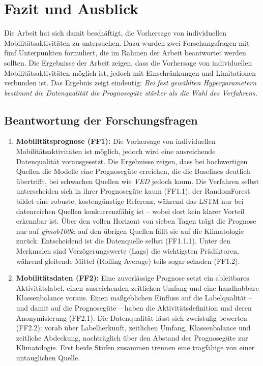 \chapter{Fazit und Ausblick}
\label{ch:fazit}

Die Arbeit hat sich damit beschäftigt, die Vorhersage von individuellen Mobilitätsaktivitäten zu untersuchen. Dazu wurden zwei Forschungsfragen mit fünf Unterpunkten formuliert, die im Rahmen der Arbeit beantwortet werden sollten. Die Ergebnisse der Arbeit zeigen, dass die Vorhersage von individuellen Mobilitätsaktivitäten möglich ist, jedoch mit Einschränkungen und Limitationen verbunden ist. Das Ergebnis zeigt eindeutig: \emph{Bei fest gewählten Hyperparametern bestimmt die Datenqualität die Prognosegüte stärker als die Wahl des
Verfahrens.}

\section{Beantwortung der Forschungsfragen}
\label{sec:beantwortung}

\begin{enumerate}
    \item \textbf{Mobilitätsprognose (FF1):} Die Vorhersage von individuellen Mobilitätsaktivitäten ist möglich, jedoch wird eine ausreichende Datenqualität vorausgesetzt. Die Ergebnisse zeigen, dass bei hochwertigen Quellen die Modelle eine Prognosegüte erreichen, die die Baselines deutlich übertrifft, bei schwachen Quellen wie \emph{VED} jedoch kaum. Die Verfahren selbst unterscheiden sich in ihrer Prognosegüte kaum (FF1.1); der RandomForest bildet eine robuste, kostengünstige Referenz, während das LSTM nur bei datenreichen Quellen konkurrenzfähig ist -- wobei dort kein klarer Vorteil erkennbar ist. Über den vollen Horizont von sieben Tagen trägt die Prognose nur auf \emph{yjmob100k}; auf den übrigen Quellen fällt sie auf die Klimatologie zurück. Entscheidend ist die Datenquelle selbst (FF1.1.1). Unter den Merkmalen sind Verzögerungswerte (Lags) die wichtigsten Prädiktoren, während gleitende Mittel (Rolling Average) teils sogar schaden (FF1.2).
    

    \item \textbf{Mobilitätsdaten (FF2):} Eine zuverlässige Prognose setzt ein ableitbares Aktivitätslabel, einen ausreichenden zeitlichen Umfang und eine handhabbare Klassenbalance voraus. Einen maßgeblichen Einfluss auf die Labelqualität -- und damit auf die Prognosegüte -- haben die Aktivitätsdefinition und deren Anonymisierung (FF2.1). Die Datenqualität lässt sich zweistufig bewerten (FF2.2): vorab über Labelherkunft, zeitlichen Umfang, Klassenbalance und zeitliche Abdeckung, nachträglich über den Abstand der Prognosegüte zur Klimatologie. Erst beide Stufen zusammen trennen eine tragfähige von einer untauglichen Quelle.
\end{enumerate}

